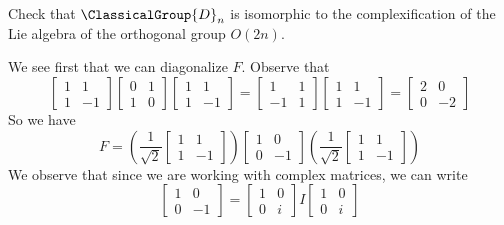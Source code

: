 \begin{exercise}
Check that $\ClassicalGroup{D}_{n}$ is isomorphic to the complexification of the
Lie algebra of the orthogonal group $O(2n)$.
\end{exercise}

\answer
We see first that we can diagonalize $F$. Observe that
\begin{equation}
\begin{bmatrix}
1&1\\
1&-1
\end{bmatrix}
\begin{bmatrix}
0&1\\
1&0
\end{bmatrix}
\begin{bmatrix}
1&1\\
1&-1
\end{bmatrix}=\begin{bmatrix}
1&1\\
-1&1
\end{bmatrix}\begin{bmatrix}
1&1\\
1&-1
\end{bmatrix}=\begin{bmatrix}
2&0\\
0&-2
\end{bmatrix}
\end{equation}
So we have
\begin{equation}
F=\left(\frac{1}{\sqrt{2}}\begin{bmatrix}
1&1\\
1&-1
\end{bmatrix}\right)\begin{bmatrix}1&0\\0&-1\end{bmatrix}
\left(\frac{1}{\sqrt{2}}\begin{bmatrix}
1&1\\
1&-1
\end{bmatrix}\right)
\end{equation}
We observe that since we are working with complex matrices, we
can write
\begin{equation}
\begin{bmatrix}1&0\\
0&-1
\end{bmatrix}=\begin{bmatrix}1&0\\
0&i\end{bmatrix}I\begin{bmatrix}1&0\\
0&i\end{bmatrix}
\end{equation}
